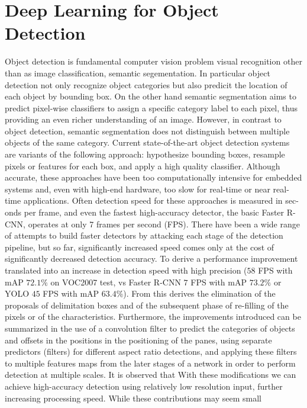 \section{Deep Learning for Object Detection}
\label{sec:nn-objectdetection}
Object detection is fundamental computer vision problem visual recognition other
than as image classification, semantic segementation. In particular object
detection not only recognize object categories but also predicit the location of
each object by  bounding box. On the other hand semantic segmentation aims to
predict pixel-wise classifiers to assign a specific category label to each
pixel, thus providing an even richer understanding of an image. However, in
contrast to object detection, semantic segmentation does not distinguish between
multiple objects of the same category.\cite{wu2020recent}
Current state-of-the-art object detection systems are variants of the following
approach: hypothesize bounding boxes, resample pixels or features for each box,
and apply a high quality classifier.  Although accurate, these approaches have
been too computationally intensive for embedded systems and, even with high-end
hardware, too slow for real-time or near real-time applications. Often detection
speed for these approaches is measured in sec- onds per frame, and even the
fastest high-accuracy detector, the basic Faster R-CNN, operates at only 7
frames per second (FPS). There have been a wide range of attempts to build
faster detectors by attacking each stage of the detection pipeline, but so far,
significantly increased speed comes only at the cost of significantly decreased
detection accuracy.\cite{liu2016ssd}
To derive a performance improvement translated into an increase in detection
speed with high precision ($58$ FPS with mAP $72.1\%$ on VOC2007 test, vs Faster
R-CNN $7$ FPS with mAP $73.2\%$ or YOLO $45$ FPS with mAP $63.4\%$). From this
derives the elimination of the proposals of delimitation boxes and of the
subsequent phase of re-filling of the pixels or of the characteristics.
Furthermore, the improvements introduced can be summarized in the use of a
convolution filter to predict the categories of objects and offsets in the
positions in the positioning of the panes, using separate predictors (filters)
for different aspect ratio detections, and applying these filters to multiple
features maps from the later stages of a network in order to perform detection
at multiple scales. It is observed that With these modifications we can achieve
high-accuracy detection using relatively low resolution input, further
increasing processing speed. While these contributions may seem small

